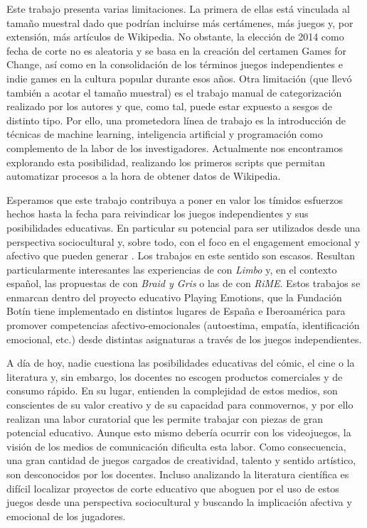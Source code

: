\documentclass[spanish]{textolivre}
\begin{document}
Este trabajo presenta varias limitaciones. La primera de ellas está vinculada al tamaño muestral dado que podrían incluirse más certámenes, más juegos y, por extensión, más artículos de Wikipedia. No obstante, la elección de 2014 como fecha de corte no es aleatoria y se basa en la creación del certamen Games for Change, así como en la consolidación de los términos juegos independientes e indie games en la cultura popular durante esos años. Otra limitación (que llevó también a acotar el tamaño muestral) es el trabajo manual de categorización realizado por los autores y que, como tal, puede estar expuesto a sesgos de distinto tipo. Por ello, una prometedora línea de trabajo es la introducción de técnicas de machine learning, inteligencia artificial y programación como complemento de la labor de los investigadores. Actualmente nos encontramos explorando esta posibilidad, realizando los primeros scripts que permitan automatizar procesos a la hora de obtener datos de Wikipedia.

Esperamos que este trabajo contribuya a poner en valor los tímidos esfuerzos hechos hasta la fecha para reivindicar los juegos independientes y sus posibilidades educativas. En particular su potencial para ser utilizados desde una perspectiva sociocultural y, sobre todo, con el foco en el engagement emocional y afectivo que pueden generar \cite{plass_foundations_2015}. Los trabajos en este sentido son escasos. Resultan particularmente interesantes las experiencias de \textcite{hanghoj2020computerspil} con \emph{Limbo} y, en el contexto español, las propuestas de \textcite{oceja_playing_2021} con \emph{Braid y Gris} o las de \textcite{hidalgo2022} con \emph{RiME}. Estos trabajos se enmarcan dentro del proyecto educativo Playing Emotions, que la Fundación Botín tiene implementado en distintos lugares de España e Iberoamérica para promover competencias afectivo-emocionales (autoestima, empatía, identificación emocional, etc.) desde distintas asignaturas a través de los juegos independientes.

A día de hoy, nadie cuestiona las posibilidades educativas del cómic, el cine o la literatura y, sin embargo, los docentes no escogen productos comerciales y de consumo rápido. En su lugar, entienden la complejidad de estos medios, son conscientes de su valor creativo y de su capacidad para conmovernos, y por ello realizan una labor curatorial que les permite trabajar con piezas de gran potencial educativo. Aunque esto mismo debería ocurrir con los videojuegos, la visión de los medios de comunicación dificulta esta labor. Como consecuencia, una gran cantidad de juegos cargados de creatividad, talento y sentido artístico, son desconocidos por los docentes. Incluso analizando la literatura científica es difícil localizar proyectos de corte educativo que aboguen por el uso de estos juegos desde una perspectiva sociocultural y buscando la implicación afectiva y emocional de los jugadores.
\end{document}
